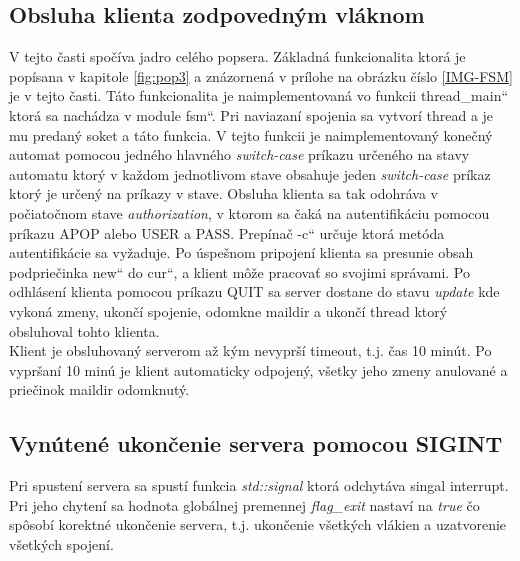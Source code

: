 \documentclass[11pt,a4paper]{article}
\providecommand{\uv}[1]{\quotedblbase #1\textquotedblleft}
\begin{document}
	\subsection{Obsluha klienta zodpovedným vláknom}
		\indent V tejto časti spočíva jadro celého popsera. Základná funkcionalita ktorá je popísana v kapitole \ref{fig:pop3} a znázornená v prílohe na obrázku číslo \ref{IMG-FSM} je v tejto časti. Táto funkcionalita je naimplementovaná vo funkcii \uv{thread\_main} ktorá sa nachádza v module \uv{fsm}. Pri naviazaní spojenia sa vytvorí thread a je mu predaný soket a táto funkcia. V tejto funkcii je naimplementovaný konečný automat pomocou jedného hlavného \textit{switch-case} príkazu určeného na stavy automatu ktorý v každom jednotlivom stave obsahuje jeden \textit{switch-case} príkaz ktorý je určený na príkazy v stave. Obsluha klienta sa tak odohráva v počiatočnom stave \textit{authorization}, v ktorom sa čaká na autentifikáciu pomocou príkazu APOP alebo USER a PASS. Prepínač \uv{-c} určuje ktorá metóda autentifikácie sa vyžaduje. Po úspešnom pripojení klienta sa presunie obsah podpriečinka \uv{new} do \uv{cur}, a klient môže pracovať so svojimi správami. Po odhlásení klienta pomocou príkazu QUIT sa server dostane do stavu \textit{update} kde vykoná zmeny, ukončí spojenie, odomkne maildir a ukončí thread ktorý obsluhoval tohto klienta.\\[0.4em]
		\indent Klient je obsluhovaný serverom až kým nevyprší timeout, t.j. čas 10 minút. Po vypršaní 10 minú je klient automaticky odpojený, všetky jeho zmeny anulované a priečinok maildir odomknutý.

	\subsection{Vynútené ukončenie servera pomocou SIGINT}
		\indent Pri spustení servera sa spustí funkcia \textit{std::signal} ktorá odchytáva singal interrupt. Pri jeho chytení sa hodnota globálnej premennej \textit{flag\_exit} nastaví na \textit{true} čo spôsobí korektné ukončenie servera, t.j. ukončenie všetkých vlákien a uzatvorenie všetkých spojení.
\end{document}
